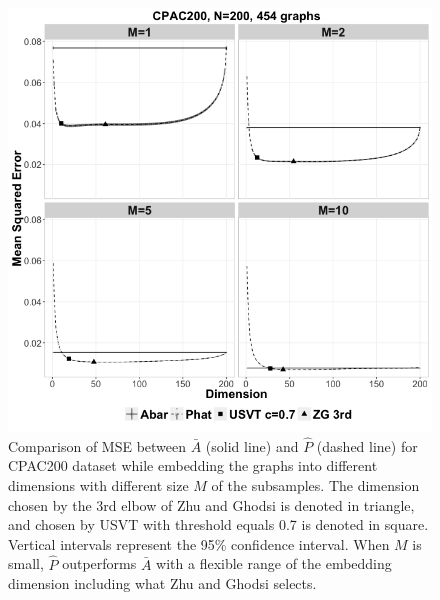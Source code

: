 \documentclass[a4paper]{article}
\begin{document}
\begin{figure}[!htb]
\centering
\includegraphics[width=1\textwidth]{CPAC200.png}
\caption{Comparison of MSE between $\bar{A}$ (solid line) and $\hat{P}$ (dashed line) for CPAC200 dataset while embedding the graphs into different dimensions with different size $M$ of the subsamples. The dimension chosen by the 3rd elbow of Zhu and Ghodsi is denoted in triangle, and chosen by USVT with threshold equals 0.7 is denoted in square.  Vertical intervals represent the 95\% confidence interval.  When $M$ is small, $\hat{P}$ outperforms $\bar{A}$ with a flexible range of the embedding dimension including what Zhu and Ghodsi selects.}
\label{fig:CPAC200}
\end{figure}
\end{document}
